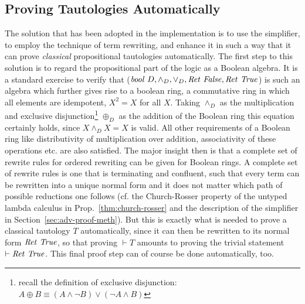 \subsection{Proving Tautologies Automatically}
The solution that has been adopted in the implementation is to use the
simplifier, \IE to employ the technique of term rewriting, and enhance it in
such a way that it can prove \emph{classical} propositional tautologies
automatically. The first step to this solution is to regard the propositional
part of the logic as a Boolean algebra. It is a standard exercise \cite[Chapter
5]{BlackburnDeRijkeVenema01} to verify that ($\mathit{bool}\ D, \land_D, \lor_D,
\mathit{Ret}~\mathit{False}, \mathit{Ret}~\mathit{True}$) is such an algebra which further gives rise to a
boolean ring, \IE a commutative ring in which all elements are idempotent, \IE
$X^2 = X$ for all $X$. Taking $\land_D$ as the multiplication and exclusive
disjunction\footnote{recall the definition of exclusive disjunction: $A \oplus B \equiv (A
  \land \lnot B) \lor (\lnot A \land B)$} $\oplus_D$ as the addition of the Boolean ring this equation
certainly holds, since $X \land_D X = X$ is valid. All other requirements of a
Boolean ring like distributivity of multiplication over addition, associativity
of these operations etc. are also satisfied. The major insight then is that a
complete set of rewrite rules for ordered rewriting can be given for Boolean
rings.  A complete set of rewrite rules is one that is terminating and
confluent, such that every term can be rewritten into a unique normal form and
it does not matter which path of possible reductions one follows (cf. the
Church-Rosser property of the untyped lambda calculus in
Prop.~\ref{thm:church-rosser} and the description of the simplifier in
Section~\ref{sec:adv-proof-meth}). But this is exactly what is needed to prove a
classical tautology $T$ automatically, since it can then be rewritten to its
normal form $\mathit{Ret}~\mathit{True}$, so that proving $\vdash T$ amounts to proving the trivial
statement $\vdash \mathit{Ret}~\mathit{True}$. This final proof step can of course be done
automatically, too.

